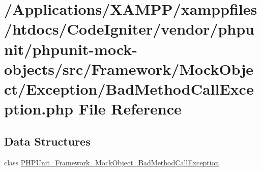 \hypertarget{_bad_method_call_exception_8php}{}\section{/\+Applications/\+X\+A\+M\+P\+P/xamppfiles/htdocs/\+Code\+Igniter/vendor/phpunit/phpunit-\/mock-\/objects/src/\+Framework/\+Mock\+Object/\+Exception/\+Bad\+Method\+Call\+Exception.php File Reference}
\label{_bad_method_call_exception_8php}
\subsection*{Data Structures}
\begin{DoxyCompactItemize}
\item 
class \mbox{\hyperlink{class_p_h_p_unit___framework___mock_object___bad_method_call_exception}{P\+H\+P\+Unit\+\_\+\+Framework\+\_\+\+Mock\+Object\+\_\+\+Bad\+Method\+Call\+Exception}}
\end{DoxyCompactItemize}
